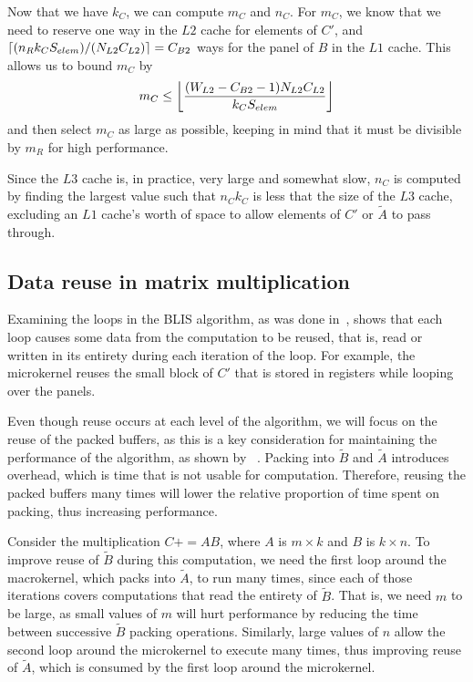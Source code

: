 \documentclass[12pt]{article}
\DeclarePairedDelimiter\ceil{\lceil}{\rceil}
\DeclarePairedDelimiter\floor{\lfloor}{\rfloor}
\newcommand*{\pluseq}{\mathrel{{+}{=}}}
\newcommand*{\mycite}[1]{~\cite{#1}}
\begin{document}
Now that we have $k_C$, we can compute $m_C$ and $n_C$.
For $m_C$, we know that we need to reserve one way in the $L2$ cache for elements of $C'$, and $\ceil*{(n_Rk_CS_{elem})/(N_{L2}C_{L2})} = C_{B2}$ ways for the panel of $B$ in the $L1$ cache.
This allows us to bound $m_C$ by
\begin{equation*}
  m_C \leq \floor*{\frac{(W_{L2} - C_{B2} - 1)N_{L2}C_{L2}}{k_CS_{elem}}}
\end{equation*}
and then select $m_C$ as large as possible, keeping in mind that it must be divisible by $m_R$ for high performance.

Since the $L3$ cache is, in practice, very large and somewhat slow, $n_C$ is computed by finding the largest value such that $n_Ck_C$ is less that the size of the $L3$ cache, excluding an $L1$ cache's worth of space to allow elements of $C'$ or $\widetilde{A}$ to pass through.

\subsection{Data reuse in  matrix multiplication}
Examining the loops in the BLIS algorithm, as was done in\mycite{Low2016}, shows that each loop causes some data from the computation to be reused, that is, read or written in its entirety during each iteration of the loop.
For example, the microkernel reuses the small block of $C'$ that is stored in registers while looping over the panels.

Even though reuse occurs at each level of the algorithm, we will focus on the reuse of the packed buffers, as this is a key consideration for maintaining the performance of the algorithm, as shown by \mycite{Henry92}.
Packing into $\widetilde{B}$ and $\widetilde{A}$ introduces overhead, which is time that is not usable for computation.
Therefore, reusing the packed buffers many times will lower the relative proportion of time spent on packing, thus increasing performance.

Consider the multiplication $C \pluseq AB$, where $A$ is $m \times k$ and $B$ is $k \times n$.
To improve reuse of $\widetilde{B}$ during this computation, we need the first loop around the macrokernel, which packs into $\widetilde{A}$, to run many times, since each of those iterations covers computations that read the entirety of $\widetilde{B}$.
That is, we need $m$ to be large, as small values of $m$ will hurt performance by reducing the time between successive $\widetilde{B}$ packing operations.
Similarly, large values of $n$ allow the second loop around the microkernel to execute many times, thus improving reuse of $\widetilde{A}$, which is consumed by the first loop around the microkernel.
\end{document}

